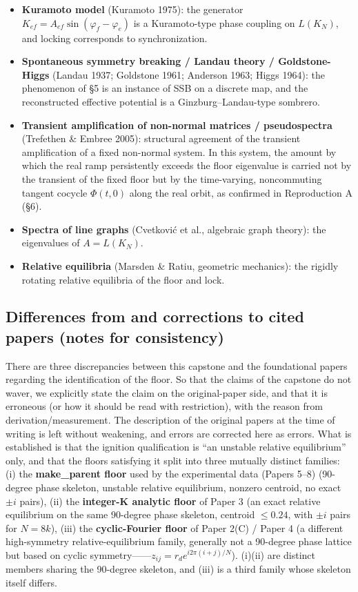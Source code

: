 \documentclass[
  a4paper,
]{ltjsarticle}
\providecommand{\tightlist}{%
  \setlength{\itemsep}{0pt}\setlength{\parskip}{0pt}}
\begin{document}
\begin{itemize}
\tightlist
\item
  \textbf{Kuramoto model} (Kuramoto 1975): the generator
  \(K_{ef}=A_{ef}\sin(\varphi_f-\varphi_e)\) is a Kuramoto-type phase
  coupling on \(L(K_N)\), and locking corresponds to synchronization.
\item
  \textbf{Spontaneous symmetry breaking / Landau theory /
  Goldstone-Higgs} (Landau 1937; Goldstone 1961; Anderson 1963; Higgs
  1964): the phenomenon of §5 is an instance of SSB on a discrete map,
  and the reconstructed effective potential is a Ginzburg--Landau-type
  sombrero.
\item
  \textbf{Transient amplification of non-normal matrices /
  pseudospectra} (Trefethen \& Embree 2005): structural agreement of the
  transient amplification of a fixed non-normal system. In this system,
  the amount by which the real ramp persistently exceeds the floor
  eigenvalue is carried not by the transient of the fixed floor but by
  the time-varying, noncommuting tangent cocycle \(\Phi(t,0)\) along the
  real orbit, as confirmed in Reproduction A (§6).
\item
  \textbf{Spectra of line graphs} (Cvetković et al., algebraic graph
  theory): the eigenvalues of \(A=L(K_N)\).
\item
  \textbf{Relative equilibria} (Marsden \& Ratiu, geometric mechanics):
  the rigidly rotating relative equilibria of the floor and lock.
\end{itemize}

\subsection{Differences from and corrections to cited papers (notes for
consistency)}\label{differences-from-and-corrections-to-cited-papers-notes-for-consistency}

There are three discrepancies between this capstone and the foundational
papers regarding the identification of the floor. So that the claims of
the capstone do not waver, we explicitly state the claim on the
original-paper side, and that it is erroneous (or how it should be read
with restriction), with the reason from derivation/measurement. The
description of the original papers at the time of writing is left
without weakening, and errors are corrected here as errors. What is
established is that the ignition qualification is ``an unstable relative
equilibrium'' only, and that the floors satisfying it split into three
mutually distinct families: (i) the \textbf{make\_parent floor} used by
the experimental data (Papers 5--8) (90-degree phase skeleton, unstable
relative equilibrium, nonzero centroid, no exact \(\pm i\) pairs), (ii)
the \textbf{integer-K analytic floor} of Paper 3 (an exact relative
equilibrium on the same 90-degree phase skeleton, centroid \(\le0.24\),
with \(\pm i\) pairs for \(N=8k\)), (iii) the \textbf{cyclic-Fourier
floor} of Paper 2(C) / Paper 4 (a different high-symmetry
relative-equilibrium family, generally not a 90-degree phase lattice but
based on cyclic symmetry------\(z_{ij}=r_d e^{i2\pi(i+j)/N}\)). (i)(ii)
are distinct members sharing the 90-degree skeleton, and (iii) is a
third family whose skeleton itself differs.
\end{document}
